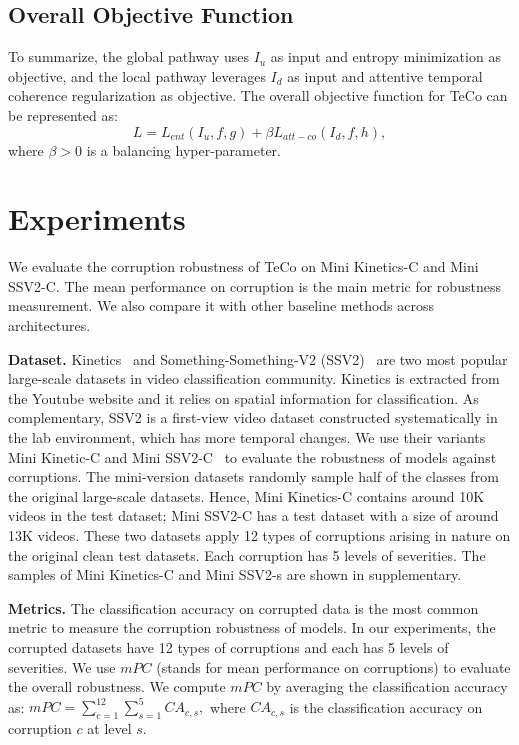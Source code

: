 \documentclass{article} %
\begin{document}
\subsection{Overall Objective Function}
To summarize, the global pathway uses $I_{u}$ as input and entropy minimization as objective, 
and the local pathway leverages $I_{d}$ as input and attentive temporal coherence regularization as objective. 
The overall objective function for TeCo can be represented as: 
\begin{equation}
    L = L_{ent}(I_{u},f,g) +\beta L_{att-co}(I_{d},f,h), 
\label{eq:overall_equation}
\end{equation}
where $\beta>0$ is a balancing hyper-parameter.

\section{Experiments}
We evaluate the corruption robustness of TeCo on Mini Kinetics-C and Mini SSV2-C. The mean performance on corruption is the main metric for robustness measurement. We also compare it with other baseline methods across architectures. 

\textbf{Dataset.}
Kinetics~\citep{carreira2017quo} and Something-Something-V2 (SSV2)~\citep{goyal2017something} are two most popular large-scale datasets in video classification community. 
Kinetics is extracted from the Youtube website and it relies on spatial information for classification. 
As complementary, SSV2 is a first-view video dataset constructed systematically in the lab environment, which has more temporal changes. 
We use their variants Mini Kinetic-C and Mini SSV2-C~\citep{yi2021benchmarking} to evaluate the robustness of models against corruptions. The mini-version datasets randomly sample half of the classes from the original large-scale datasets. Hence, Mini Kinetics-C contains around 10K videos in the test dataset; Mini SSV2-C has a test dataset with a size of around 13K videos.
These two datasets apply 12 types of corruptions arising in nature on the original clean test datasets. 
Each corruption has 5 levels of severities. 
The samples of Mini Kinetics-C and Mini SSV2-s are shown in supplementary.

\textbf{Metrics.}
The classification accuracy on corrupted data is the most common metric to measure the corruption robustness of models. 
In our experiments, the corrupted datasets have 12 types of corruptions and each has 5 levels of severities. 
We use $mPC$ (stands for mean performance on corruptions) to evaluate the overall robustness. 
We compute $mPC$ by averaging the classification accuracy as: $mPC=\sum_{c=1}^{12} \sum_{s=1}^{5} CA_{c,s},$
where $CA_{c,s}$ is the classification accuracy on corruption $c$ at level $s$. 
\end{document}
